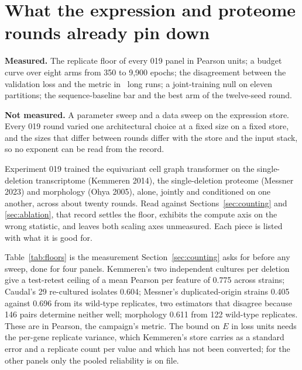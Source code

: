 

\section{What the expression and proteome rounds already pin down}
\label{sec:expression}

\begin{keybox}
\textbf{Measured.} The replicate floor of every 019 panel in Pearson units; a
budget curve over eight arms from 350 to 9{,}900 epochs; the disagreement between
the validation loss and the metric in \lossLiveRuns\ long runs; a joint-training
null on eleven partitions; the sequence-baseline bar and the best arm of the
twelve-seed round.

\textbf{Not measured.} A parameter sweep and a data sweep on the expression
store. Every 019 round varied one architectural choice at a fixed size on a fixed
store, and the sizes that differ between rounds differ with the store and the
input stack, so no exponent can be read from the record.
\end{keybox}

Experiment 019 trained the equivariant cell graph transformer on the single-deletion
transcriptome (Kemmeren 2014), the single-deletion proteome (Messner 2023) and
morphology (Ohya 2005), alone, jointly and conditioned on one another, across about
twenty rounds. Read against Sections~\ref{sec:counting} and \ref{sec:ablation}, that
record settles the floor, exhibits the compute axis on the wrong statistic, and
leaves both scaling axes unmeasured. Each piece is listed with what it is good for.

Table~\ref{tab:floors} is the measurement Section~\ref{sec:counting} asks for before
any sweep, done for four panels. Kemmeren's two independent cultures per deletion
give a test-retest ceiling of a mean Pearson per feature of 0.775 across strains;
Caudal's 29 re-cultured isolates 0.604; Messner's duplicated-origin strains 0.405
against 0.696 from its wild-type replicates, two estimators that disagree because 146
pairs determine neither well; morphology 0.611 from 122 wild-type replicates. These are
in Pearson, the campaign's metric. The bound on $E$ in loss units needs the per-gene
replicate variance, which Kemmeren's store carries as a standard error and a replicate
count per value and which has not been converted; for the other panels only the
pooled reliability is on file.

